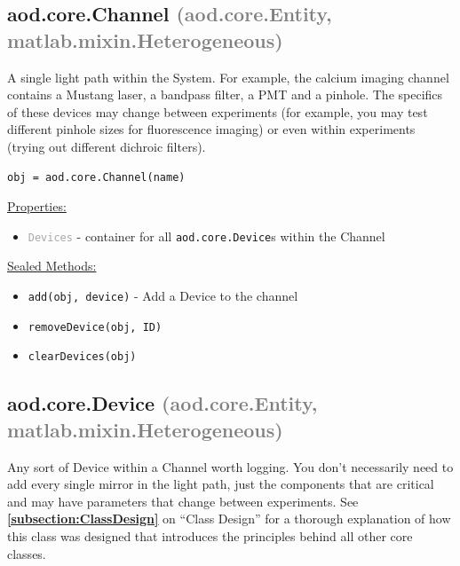 \documentclass[10pt]{exam}
\newcommand\myurl[1]{\textcolor{blue}{\underline{#1}}}
\newcommand\myref[1]{\textbf{\myurl{\ref{#1}}}}
\newcommand\myparent[1]{\textcolor{gray}{(#1)}}
\newcommand\aodclass[1]{\textcolor{codeblue}{\texttt{#1}}}
\newcommand\aodprop[1]{\textcolor{darkgray}{\texttt{#1}}}
\newcommand\aodfcn[1]{\textcolor{darkteal}{\texttt{#1}}}
\newcommand\docheader[1]{\vspace{0.6ex}\noindent\underline{#1}\vspace{0.15ex}}
\begin{document}
	\subsection{aod.core.Channel \myparent{aod.core.Entity, matlab.mixin.Heterogeneous}} 
		\label{subsection:ChannelDoc}
		\noindent A single light path within the System. For example, the calcium imaging channel contains a Mustang laser, a bandpass filter, a PMT and a pinhole. The specifics of these devices may change between experiments (for example, you may test different pinhole sizes for fluorescence imaging) or even within experiments (trying out different dichroic filters).
		
		\begin{lstlisting}[style=matlab-editor, basicstyle=\mlttfamily\footnotesize]
obj = aod.core.Channel(name)
		\end{lstlisting}
		
		\docheader{Properties:}
		\begin{itemize}
			\item \aodprop{Devices} - container for all \aodclass{aod.core.Device}s within the Channel
		\end{itemize}
		\docheader{Sealed Methods:}
		\begin{itemize}
			\item \aodfcn{add(obj, device)} - Add a Device to the channel
			\item \aodfcn{removeDevice(obj, ID)}
			\item \aodfcn{clearDevices(obj)}
		\end{itemize}

	\subsection{aod.core.Device  \myparent{aod.core.Entity, matlab.mixin.Heterogeneous}}
		\noindent Any sort of Device within a Channel worth logging. You don't necessarily need to add every single mirror in the light path, just the components that are critical and may have parameters that change between experiments. See \myref{subsection:ClassDesign} on ``Class Design'' for a thorough explanation of how this class was designed that introduces the principles behind all other core classes.
		
\end{document}
